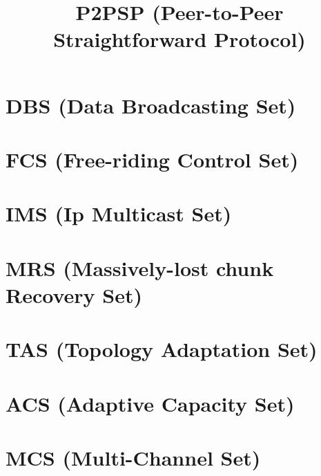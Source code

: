\newcommand{\note}[1]{\color{red}\textbf{#1}}

\title{P2PSP (Peer-to-Peer Straightforward Protocol)}
\maketitle
\tableofcontents

\begin{abstract}

\end{abstract}

\section{DBS (Data Broadcasting Set)}
\label{sec:DBS}


\section{FCS (Free-riding Control Set)}
\label{sec:FCS}


\section{IMS (Ip Multicast Set)}
\label{sec:IMS}


\section{MRS (Massively-lost chunk Recovery Set)}
\label{sec:MRS}


\section{TAS (Topology Adaptation Set)}
\label{sec:TAS}


\section{ACS (Adaptive Capacity Set)}
\label{sec:ACS}


\section{MCS (Multi-Channel Set)}
\label{sec:MCS}



